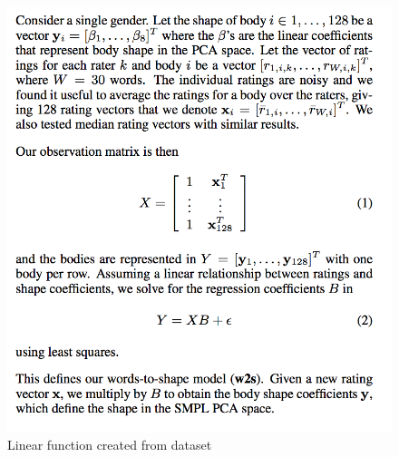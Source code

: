 \documentclass[journal]{vgtc}                %
\begin{document}
\begin{figure}[!htb]
	\includegraphics[width=\columnwidth]{algo}
	\caption{Linear function created from dataset}
\end{figure}
\end{document}
